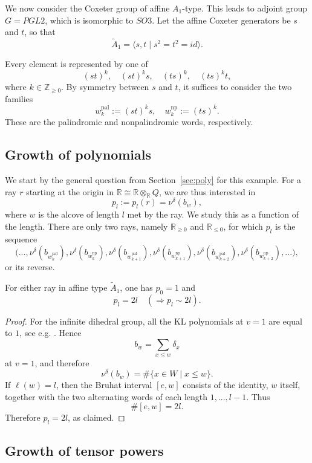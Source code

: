 \documentclass[a4paper,11pt]{amsart}
\renewcommand{\dots}{\text{...}}
\newcommand{\R}{\mathbb{R}}
\newcommand{\N}{\mathbb{Z}_{\geq 0}}
\numberwithin{equation}{subsection}
\theoremstyle{definition}
\theoremstyle{remark}
\begin{document}
We now consider the Coxeter group of affine $A_1$-type. This leads to adjoint group
\(G=PGL2\), which is isomorphic
to \(SO3\). Let the affine Coxeter generators be $s$ and $t$, so that
\[
\widetilde A_1=\langle s,t\mid s^2=t^2=id\rangle.
\]

Every element is represented by one of
\[
(st)^k,\quad (st)^ks,\quad (ts)^k,\quad (ts)^kt,
\]
where $k\in \N$. By symmetry between $s$ and $t$, it suffices to consider the
two families
\[
w_k^{\mathrm{pal}}:=(st)^ks,
\quad
w_k^{\mathrm{np}}:=(ts)^k.
\]
These are the palindromic and nonpalindromic words, respectively.

\subsection{Growth of polynomials}\label{sec:polaa}
We start by the general question from Section~\ref{sec:poly} for this example.
For a ray $r$ starting at the origin in $\R\cong \R\otimes_{\R}Q$, we are thus interested in
\[
p_l:=p_l(r)=\nu^\delta(b_w),
\]
where $w$ is the alcove of length $l$ met by the ray. We study this as a
function of the length.
There are only two rays, namely $\R_{\geq 0}$ and $\R_{\leq 0}$,
for which $p_l$ is the sequence
\[
\big(\dots,\nu^\delta(b_{w_k^{\mathrm{pal}}}),
\nu^\delta(b_{w_k^{\mathrm{np}}}),
\nu^\delta(b_{w_{k+1}^{\mathrm{pal}}}),
\nu^\delta(b_{w_{k+1}^{\mathrm{np}}}),
\nu^\delta(b_{w_{k+2}^{\mathrm{pal}}}),
\nu^\delta(b_{w_{k+2}^{\mathrm{np}}}),
\dots
\big),
\]
or its reverse. 

\begin{Proposition}
For either ray in affine type $\widetilde A_1$, one has $p_0=1$ and
\[
p_l=2l
\quad
(\Rightarrow p_l\sim 2l).
\]
\end{Proposition}

\begin{proof}
For the infinite dihedral group, all the KL polynomials at $v=1$ are equal
to $1$, see e.g. \cite{duCl-positivity-finite-hecke}. Hence
\[
b_w=\sum_{x\leq w}\delta_x
\]
at $v=1$, and therefore
\[
\nu^\delta(b_w)=\#\{x\in W\mid x\leq w\}.
\]
If $\ell(w)=l$, then the Bruhat interval $[e,w]$ consists of the identity, $w$ itself,
together with the two alternating words of each length $1,\dots,l-1$. Thus
\[
\#[e,w]=2l.
\]
Therefore $p_l=2l$, as claimed.
\end{proof}

\subsection{Growth of tensor powers}
\end{document}
